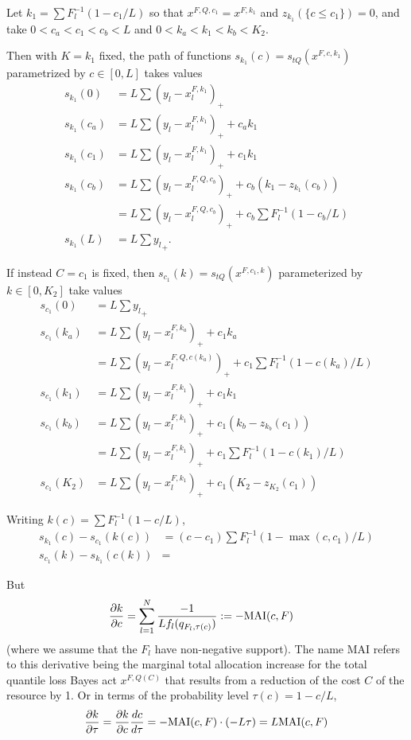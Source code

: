\documentclass{article}
\begin{document}
Let $k_1 = \sum F_l^{-1}(1-c_1/L)$ so that $x^{F,Q,c_1} = x^{F, k_1}$ and $z_{k_1}(\{c \leq c_1\}) = 0$, and take $0<c_a < c_1 < c_b < L$ and $0 < k_a < k_1 < k_b < K_2$.

Then with $K = k_1$ fixed, the path of functions $s_{k_1}(c) = s_{tQ}(x^{F,c,k_1})$ parametrized by $c \in [0,L]$ takes values
\begin{align}
s_{k_1}(0)  &= L\sum ( y_l-x_l^{F,k_1})_{+}  \\
s_{k_1}(c_a)  &= L\sum ( y_l-x_l^{F,k_1})_{+} + c_a k_1\\
s_{k_1}(c_1) &= L\sum (y_l - x_l^{F,k_1})_{+} + c_1 k_1  \\
s_{k_1}(c_b) &= L\sum (y_l - x_l^{F,Q, c_b})_{+} + c_b(k_1 - z_{k_1}(c_b)) \\
&= L\sum (y_l - x_l^{F,Q, c_b})_{+} + c_b \sum F_l^{-1}(1-c_b/L)\\
s_{k_1}(L)  &= L\sum {y_l}_{+}.
\end{align}

If instead $C = c_1$ is fixed, then $s_{c_1}(k) = s_{tQ}(x^{F,c_1,k})$ parameterized by 
$k \in [0,K_2]$ take values
\begin{align}
s_{c_1}(0) & = L \sum {y_l}_{+} \\
s_{c_1}(k_a) & = L \sum (y_l - x_l^{F,k_a})_{+} + c_1 k_a\\
& = L \sum (y_l - x_l^{F,Q,c(k_a)})_{+} + c_1 \sum F_l^{-1}(1-c(k_a)/L)\\
s_{c_1}(k_1) & = L \sum (y_l - x_l^{F,k_1})_{+} + c_1 k_1 \\
s_{c_1}(k_b) & = L \sum (y_l - x_l^{F,k_1})_{+} + c_1 (k_b - z_{k_b}(c_1)) \\
 & = L \sum (y_l - x_l^{F,k_1})_{+} + c_1 \sum F_l^{-1}(1-c(k_1)/L)\\
s_{c_1}(K_2) & = L \sum (y_l - x_l^{F,k_1})_{+} + c_1 (K_2 - z_{K_2}(c_1))
\end{align}

Writing $k(c) = \sum F_l^{-1}(1-c/L)$,
\begin{align}
s_{k_1}(c) - s_{c_1}(k(c)) &= (c-c_1)\sum F_l^{-1}(1-\max(c,c_1)/L) \\
s_{c_1}(k) - s_{k_1}(c(k)) &=  
\end{align}


But 
\begin{align}
\frac{\partial {k} }{\partial {c}}& = \sum_{l=1}^{N} \frac{-1}{L f_l(q_{F_l,\tau(c)})} := -\mathrm{MAI}(c,F)\label{eqn:dkdc}
\end{align}
(where we assume that the $F_l$ have non-negative support). The name MAI refers to this derivative being the marginal total allocation increase for the total quantile loss Bayes act $x^{F,Q(C)}$ that results from a reduction of the cost $C$ of the resource by 1. Or in terms of the probability level $\tau(c)=1-c/L$,
\begin{align}
\frac{\partial {k} }{\partial {\tau}} = \frac{\partial {k} }{\partial {c}}\frac{d {c} }{d {\tau}} = -\mathrm{MAI}(c,F) \cdot (-L\tau) = L\mathrm{MAI}(c,F) \label{eqn:dkdtau}
\end{align}
\end{document}
